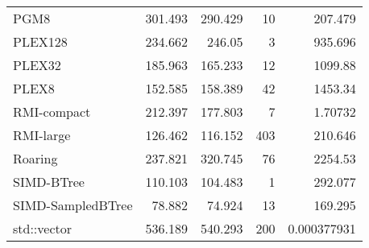 \begin{tabular}{lrrrr}
 PGM8              &                301.493 &               290.429 &           10 &   207.479       \\
 PLEX128           &                234.662 &               246.05  &            3 &   935.696       \\
 PLEX32            &                185.963 &               165.233 &           12 &  1099.88        \\
 PLEX8             &                152.585 &               158.389 &           42 &  1453.34        \\
 RMI-compact       &                212.397 &               177.803 &            7 &     1.70732     \\
 RMI-large         &                126.462 &               116.152 &          403 &   210.646       \\
 Roaring           &                237.821 &               320.745 &           76 &  2254.53        \\
 SIMD-BTree        &                110.103 &               104.483 &            1 &   292.077       \\
 SIMD-SampledBTree &                 78.882 &                74.924 &           13 &   169.295       \\
 std::vector       &                536.189 &               540.293 &          200 &     0.000377931 \\
\hline
\end{tabular}